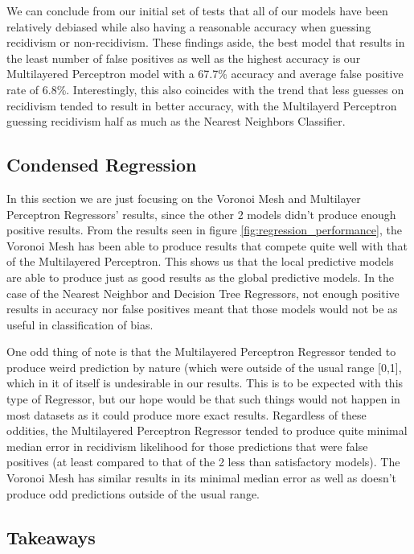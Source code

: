 \documentclass[sigconf]{acmart}
\begin{document}
We can conclude from our initial set of tests that all of our models have been relatively debiased while also having a reasonable accuracy when guessing recidivism or non-recidivism. These findings aside, the best model that results in the least number of false positives as well as the highest accuracy is our Multilayered Perceptron model with a 67.7\% accuracy and average false positive rate of 6.8\%. Interestingly, this also coincides with the trend that less guesses on recidivism tended to result in better accuracy, with the Multilayerd Perceptron guessing recidivism half as much as the Nearest Neighbors Classifier.

\subsection{Condensed Regression}

In this section we are just focusing on the Voronoi Mesh and Multilayer Perceptron Regressors' results, since the other 2 models didn't produce enough positive results. From the results seen in figure \ref{fig:regression_performance}, the Voronoi Mesh has been able to produce results that compete quite well with that of the Multilayered Perceptron. This shows us that the local predictive models are able to produce just as good results as the global predictive models. In the case of the Nearest Neighbor and Decision Tree Regressors, not enough positive results in accuracy nor false positives meant that those models would not be as useful in classification of bias. 

One odd thing of note is that the Multilayered Perceptron Regressor tended to produce weird prediction by nature (which were outside of the usual range [0,1], which in it of itself is undesirable in our results. This is to be expected with this type of Regressor, but our hope would be that such things would not happen in most datasets as it could produce more exact results. Regardless of these oddities, the Multilayered Perceptron Regressor tended to produce quite minimal median error in recidivism likelihood for those predictions that were false positives (at least compared to that of the 2 less than satisfactory models). The Voronoi Mesh has similar results in its minimal median error as well as doesn't produce odd predictions outside of the usual range.

\subsection{Takeaways}
\end{document}
